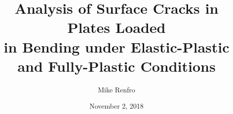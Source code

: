 \makeatletter
\def\beamer@framenotesbegin{%
  \gdef\beamer@noteitems{}%
  \gdef\beamer@notes{{}}%
}
\makeatother
{}

\usepackage{listings}
\lstset{basicstyle=\ttfamily\small}
\usepackage{graphicx} \graphicspath{{content/figures/}}
\usepackage{booktabs}
\usepackage{cool}
\usepackage{bm} %
\usepackage{siunitx}
\usepackage[backend=biber,natbib=true,style=authoryear,sorting=none,firstinits=true]{biblatex}





\author{Mike Renfro}

\title[Analysis of Surface Cracks in Bending under EP and FP Conditions]{Analysis of Surface Cracks in Plates Loaded \\
in Bending under Elastic-Plastic\\
and Fully-Plastic Conditions}

\date{November 2, 2018}



\newcommand{\linktopage}[2]{\structure{\hyperlink{Navigation#1}{#2}}}



\begin{frame}[plain]
\maketitle
{}
\end{frame}

